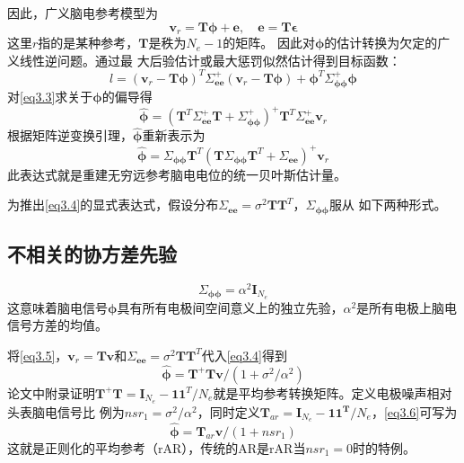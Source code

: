 因此，广义脑电参考模型为
\begin{equation}\label{eq3.2}
\mathbf{v}_{r}=\mathbf{T\phi+e},\quad\mathbf{e=T\epsilon}
\end{equation}
这里$r$指的是某种参考，$\mathbf{T}$是秩为$N_{e}-1$的矩阵。 因此对$\mathbf{\phi}$的估计转换为欠定的广义线性逆问题。通过最
大后验估计或最大惩罚似然估计得到目标函数：
\begin{equation}\label{eq3.3}
l=(\mathbf{v}_r-\mathbf{T\phi})^T\Sigma_\mathbf{ee}^+(\mathbf{v}_r-\mathbf{T\phi})+\mathbf{\phi}^T\Sigma_\mathbf{\phi\phi}^+\mathbf{\phi}
\end{equation}
对\eqref{eq3.3}求关于$\mathbf{\phi}$的偏导得
\begin{equation}
\hat{\mathbf{\phi}}=(\mathbf{T}^T\Sigma_\mathbf{ee}^+\mathbf{T}+\Sigma_\mathbf{\phi\phi}^+)^+\mathbf{T}^T\Sigma_\mathbf{ee}^+\mathbf{v}_r
\end{equation}
根据矩阵逆变换引理，$\hat{\mathbf{\phi}}$重新表示为
\begin{equation}\label{eq3.4}
\hat{\mathbf{\phi}}=\Sigma_\mathbf{\phi\phi}\mathbf{T}^T(\mathbf{T}\Sigma_\mathbf{\phi\phi}\mathbf{T}^T+\Sigma_\mathbf{ee})^+\mathbf{v}_r
\end{equation}
此表达式就是重建无穷远参考脑电电位的统一贝叶斯估计量。

为推出\eqref{eq3.4}的显式表达式，假设分布$\Sigma_\mathbf{ee}=\sigma^{2}\mathbf{TT}^T$，$\Sigma_\mathbf{\phi\phi}$服从
如下两种形式。
\subsection{不相关的协方差先验}
\begin{equation}\label{eq3.5}
\Sigma_\mathbf{\phi\phi}=\alpha^{2}\mathbf{I}_{N_e}
\end{equation}
这意味着脑电信号$\mathbf{\phi}$具有所有电极间空间意义上的独立先验，$\alpha^2$是所有电极上脑电信号方差的均值。

将\eqref{eq3.5}，$\mathbf{v}_{r}=\mathbf{Tv}$和$\Sigma_\mathbf{ee}=\sigma^{2}\mathbf{TT}^T$代入\eqref{eq3.4}得到
\begin{equation}\label{eq3.6}
\hat{\mathbf{\phi}}=\mathbf{T^{+}Tv}/(1+\sigma^{2}/{\alpha^{2}})
\end{equation}
论文中附录证明$\mathbf{T^+T}=\mathbf{I}_{N_e}-\mathbf{11}^T/N_e$就是平均参考转换矩阵。定义电极噪声相对头表脑电信号比
例为$nsr_1=\sigma^2/\alpha^2$，同时定义$\mathbf{T}_{ar}=\mathbf{I}_{N_e}-\mathbf{11^T}/{N_e}$，\eqref{eq3.6}可写为
\begin{equation}\label{eq3.7}
\hat{\mathbf{\phi}}=\mathbf{T}_{ar}\mathbf{v}/(1+nsr_1)
\end{equation}
这就是正则化的平均参考（rAR），传统的AR是rAR当$nsr_1=0$时的特例。
